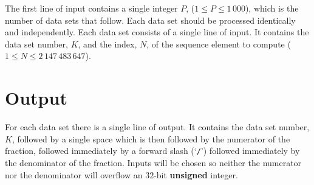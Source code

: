 The first line of input contains a single integer $P$, ($1 \le P \le 1\,000$), which is the number of data sets
that follow. Each data set should be processed identically and independently.
Each data set consists of a single line of input. It contains the data set number, $K$, and the index, $N$,
of the sequence element to compute ($1 \le N \le 2\,147\,483\,647$).

\section*{Output}

For each data set there is a single line of output. It contains the data set number, $K$, followed by a
single space which is then followed by the numerator of the fraction, followed immediately by a
forward slash (`\texttt{/}') followed immediately by the denominator of the fraction. Inputs will be chosen so
neither the numerator nor the denominator will overflow an $32$-bit \textbf{unsigned} integer.

